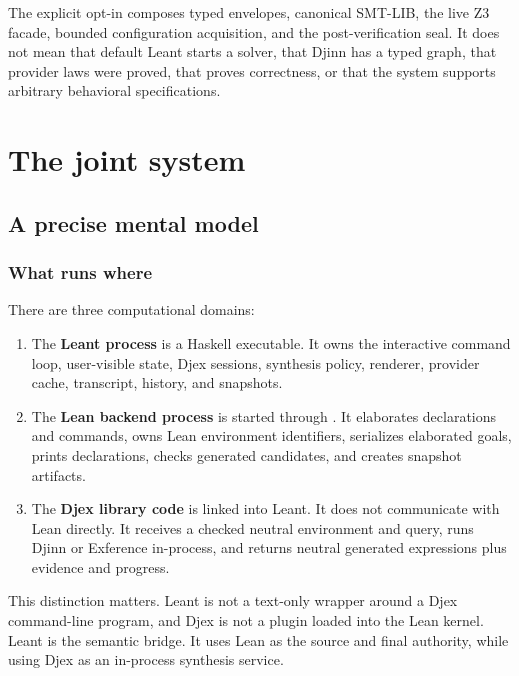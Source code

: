 \documentclass[10pt,letterpaper,oneside]{report}
\newcommand{\code}[1]{\texttt{\detokenize{#1}}}
\newcommand{\term}[1]{\textbf{#1}}
\begin{document}
\begin{pitfallbox}[title={Do not read readiness as completion}]
The explicit opt-in composes typed envelopes, canonical SMT-LIB, the live Z3 facade, bounded configuration acquisition, and the post-verification seal. It does not mean that default Leant starts a solver, that Djinn has a typed graph, that provider laws were proved, that \code{unsat} proves correctness, or that the system supports arbitrary behavioral specifications.
\end{pitfallbox}

\part{The joint system}

\chapter{A precise mental model}\label{ch:joint-model}

\section{What runs where}

There are three computational domains:

\begin{enumerate}
  \item The \term{Leant process} is a Haskell executable. It owns the interactive command loop, user-visible state, Djex sessions, synthesis policy, renderer, provider cache, transcript, history, and snapshots.
  \item The \term{Lean backend process} is started through \code{lake env}. It elaborates declarations and commands, owns Lean environment identifiers, serializes elaborated goals, prints declarations, checks generated candidates, and creates snapshot artifacts.
  \item The \term{Djex library code} is linked into Leant. It does not communicate with Lean directly. It receives a checked neutral environment and query, runs Djinn or Exference in-process, and returns neutral generated expressions plus evidence and progress.
\end{enumerate}

This distinction matters. Leant is not a text-only wrapper around a Djex command-line program, and Djex is not a plugin loaded into the Lean kernel. Leant is the semantic bridge. It uses Lean as the source and final authority, while using Djex as an in-process synthesis service.
\end{document}
